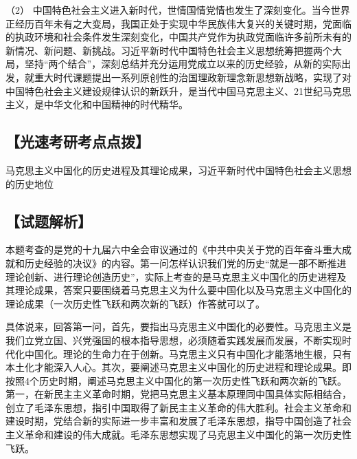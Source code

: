 \documentclass[UTF8,11pt]{ctexart}
\begin{document}
（2） 中国特色社会主义进入新时代，世情国情党情也发生了深刻变化。当今世界正经历百年未有之大变局，我国正处于实现中华民族伟大复兴的关键时期，党面临的执政环境和社会条件发生深刻变化，中国共产党作为执政党面临许多前所未有的新情况、新问题、新挑战。习近平新时代中国特色社会主义思想统筹把握两个大局，坚持“两个结合”，深刻总结并充分运用党成立以来的历史经验，从新的实际出发，就重大时代课题提出一系列原创性的治国理政新理念新思想新战略，实现了对中国特色社会主义建设规律认识的新跃升，是当代中国马克思主义、21世纪马克思主义，是中华文化和中国精神的时代精华。


\subsection*{【光速考研考点点拨】}

马克思主义中国化的历史进程及其理论成果，习近平新时代中国特色社会主义思想的历史地位


\subsection*{【试题解析】}

本题考查的是党的十九届六中全会审议通过的《中共中央关于党的百年奋斗重大成就和历史经验的决议》的内容。第一问怎样认识我们党的历史“就是一部不断推进理论创新、进行理论创造历史”，实际上考查的是马克思主义中国化的历史进程及其理论成果，答案只要围绕着马克思主义为什么要中国化以及马克思主义中国化的理论成果（一次历史性飞跃和两次新的飞跃）作答就可以了。


具体说来，回答第一问，首先，要指出马克思主义中国化的必要性。马克思主义是我们立党立国、兴党强国的根本指导思想，必须随着实践发展而发展，不断实现时代化中国化。理论的生命力在于创新。马克思主义只有中国化才能落地生根，只有本土化才能深入人心。其次，要阐述马克思主义中国化的历史进程和理论成果。即按照4个历史时期，阐述马克思主义中国化的第一次历史性飞跃和两次新的飞跃。第一，在新民主主义革命时期，党把马克思主义基本原理同中国具体实际相结合，创立了毛泽东思想，指引中国取得了新民主主义革命的伟大胜利。社会主义革命和建设时期，党结合新的实际进一步丰富和发展了毛泽东思想，指导中国创造了社会主义革命和建设的伟大成就。毛泽东思想实现了马克思主义中国化的第一次历史性飞跃。
\end{document}
